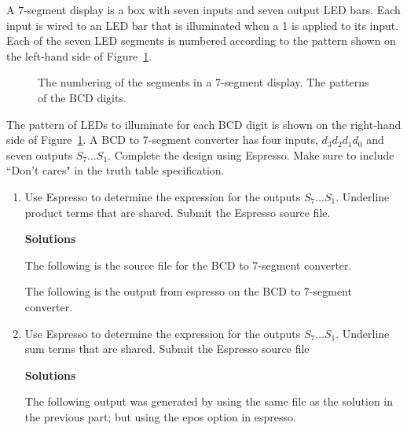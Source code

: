 \begin{enumerate}
A 7-segment display is a box with seven inputs and seven output LED bars.  
Each input is wired to an LED bar that is illuminated when a 1 is applied 
to its input.
Each of the seven LED segments is numbered according to the pattern shown
on the left-hand side of Figure~\ref{fig:BCD}. 

\begin{figure}[ht]
\caption{The numbering of the segments in a 7-segment display.
The patterns of the BCD digits.}
\label{fig:BCD}
\end{figure}

The pattern of LEDs to illuminate for each BCD digit is shown on the 
right-hand side of Figure~\ref{fig:BCD}.  A BCD to 7-segment converter 
has four inputs, $d_3 d_2 d_1 d_0$ and seven outputs $S_7 \ldots S_1$.  
Complete the design using Espresso.  Make sure to include ``Don't cares" 
in the truth table specification. 
\begin{enumerate}
	\item Use Espresso to determine the \SOPmin expression for the outputs 
	$S_7 \ldots S_1$.  Underline product terms that are shared.
	Submit the Espresso source file.

\begin{onlysolution} \textbf{Solutions} \itshape{
The following is the source file for the BCD to 7-segment converter.


The following is the output from espresso on the 
BCD to 7-segment converter.

} \end{onlysolution} 

	\item Use Espresso to determine the \POSmin expression for the outputs 
	$S_7 \ldots S_1$.  Underline sum terms that are shared.
	Submit the Espresso source file
\begin{onlysolution} \textbf{Solutions} \itshape {
The following output was generated by using the same file
as the solution in the previous part; but using the epos
option in espresso.

}
\end{onlysolution}
\end{enumerate}
\end{enumerate}
